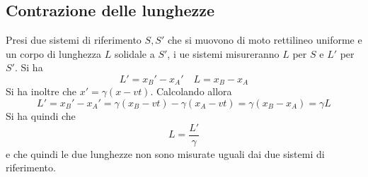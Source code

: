 \subsection{Contrazione delle lunghezze}
Presi due sistemi di riferimento $S,S'$ che si muovono di moto rettilineo uniforme e un corpo di
lunghezza $L$ solidale a $S'$, i ue sistemi misureranno $L$ per $S$ e $L'$ per $S'$. Si ha
\begin{equation*}
  L'= x_B'-x_A'\quad L=x_B-x_A
\end{equation*}
Si ha inoltre che $x'=\gamma(x-vt)$. Calcolando allora
\begin{equation*}
  L' = x_B'-x_A'=\gamma(x_B-vt)-\gamma(x_A-vt)=\gamma(x_B-x_A)=\gamma L
\end{equation*}
Si ha quindi che
\begin{equation*}
  L = \frac{L'}{\gamma}
\end{equation*}
e che quindi le due lunghezze non sono misurate uguali dai due sistemi di riferimento.

